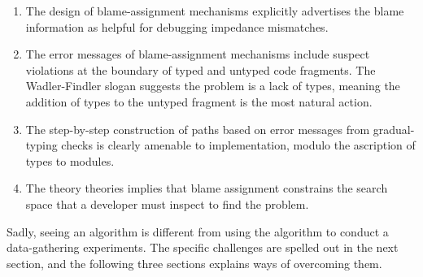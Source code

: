 \begin{enumerate}

\item The design of blame-assignment mechanisms explicitly advertises the blame
information as helpful for debugging impedance mismatches.

\item The error messages of blame-assignment mechanisms include suspect
violations at the boundary of typed and untyped code fragments. The
Wadler-Findler slogan suggests the problem is a lack of types, meaning the
addition of types to the untyped fragment is the most natural action. 

\item The step-by-step construction of paths based on error messages from
gradual-typing checks is clearly amenable to implementation, modulo the
ascription of types to modules.

\item The theory theories implies that blame assignment constrains the search
space that a developer must inspect to find the problem.

\end{enumerate}
Sadly, seeing an algorithm is different from using the algorithm to conduct a
data-gathering experiments. The specific challenges are spelled out in the next
section, and the following three sections explains ways of overcoming them. 




